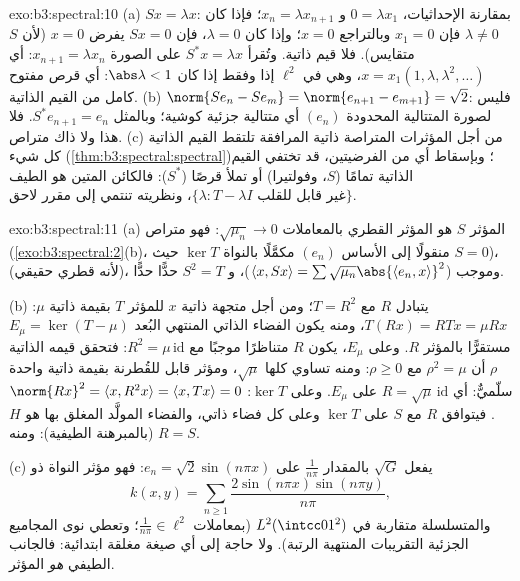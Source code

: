 \begin{solution}{exo:b3:spectral:10}
(a) $Sx = \lambda x$: بمقارنة الإحداثيات، $0 = \lambda
x_1$ و $x_n = \lambda x_{n+1}$؛
فإذا كان $\lambda \ne 0$ فإن $x_1 = 0$ وبالتراجع $x = 0$؛ وإذا
كان $\lambda = 0$، فإن $Sx = 0$ يفرض $x = 0$ (لأن $S$ متقايس).
فلا قيم ذاتية. وتُقرأ $S^*x =
\lambda x$ على الصورة $x_{n+1} = \lambda x_n$: أي $x =
x_1(1, \lambda, \lambda^2, \dots)$، وهي
في $\ell^2$ إذا وفقط إذا كان $\abs\lambda < 1$: أي قرص مفتوح كامل من القيم
الذاتية.
(b) $\norm{Se_n - Se_m} = \norm{e_{n+1} - e_{m+1}} = \sqrt2$: فليس لصورة المتتالية المحدودة $(e_n)$ أي متتالية
جزئية كوشية؛ وبالمثل $S^*e_{n+1} = e_n$. فلا هذا ولا ذاك متراص.
(c) من أجل المؤثرات المتراصة ذاتية المرافقة تلتقط القيم الذاتية
كل شيء (\cref{thm:b3:spectral:spectral})؛ وبإسقاط أي من الفرضيتين، قد تختفي القيم
الذاتية تمامًا ($S$، وفولتيرا) أو تملأ قرصًا ($S^*$): فالكائن
المتين هو الطيف $\{\lambda : T - \lambda I \text{ غير قابل للقلب}\}$، ونظريته تنتمي إلى مقرر لاحق.
\end{solution}

\begin{solution}{exo:b3:spectral:11}
(a) المؤثر $S$ هو المؤثر القطري بالمعاملات $\sqrt{\mu_n} \to 0$: فهو متراص
(\cref{exo:b3:spectral:2}(b)، منقولًا إلى الأساس $(e_n)$ مكمَّلًا بالنواة
$\ker T$ حيث $S = 0$)،  (لأنه قطري حقيقي)، وموجب
($\langle x, Sx\rangle =
\sum\sqrt{\mu_n}\abs{\langle e_n, x\rangle}^2$)، و $S^2 =
T$ حدًّا حدًّا.

(b) يتبادل $R$ مع $T = R^2$؛ ومن أجل متجهة ذاتية $x$ للمؤثر
$T$ بقيمة ذاتية $\mu$: $T(Rx) = RTx = \mu Rx$، ومنه يكون الفضاء الذاتي المنتهي
البُعد $E_\mu = \ker(T - \mu)$ مستقرًّا بالمؤثر $R$. وعلى $E_\mu$، يكون $R$
متناظرًا موجبًا مع $R^2
= \mu\,\mathrm{id}$: فتحقق قيمه الذاتية $\rho$ أن
$\rho^2
= \mu$ مع $\rho \geq 0$: ومنه تساوي كلها $\sqrt\mu$، ومؤثر
قابل للقُطرنة بقيمة ذاتية واحدة سلّميٌّ: أي $R = \sqrt\mu\,\mathrm{id}$ على
$E_\mu$. وعلى $\ker T$: $\norm
{Rx}^2 = \langle x, R^2x\rangle = \langle x, Tx\rangle = 0$. فيتوافق $R$ مع $S$ على
$\ker T$ وعلى كل فضاء ذاتي، والفضاء المولَّد المغلق بها هو $H$
(بالمبرهنة الطيفية): ومنه $R = S$.

(c) يفعل $\sqrt G$ بالمقدار $\frac1{n\pi}$ على $e_n =
\sqrt2\sin(n\pi x)$: فهو
مؤثر النواة ذو
\[
k(x, y) = \sum_{n\geq1}\frac{2\sin(n\pi x)\sin(n\pi
y)}{n\pi},
\]
والمتسلسلة متقاربة في $L^2(\intcc01^2)$ (بمعاملات $\frac1{n\pi} \in \ell^2$؛ وتعطي نوى
المجاميع الجزئية التقريبات المنتهية الرتبة). ولا حاجة إلى أي
صيغة مغلقة ابتدائية: فالجانب الطيفي \emph{هو} المؤثر.
\end{solution}

